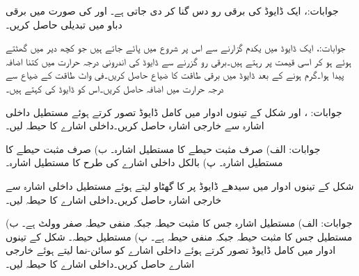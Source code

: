 جوابات:، 
ایک ڈایوڈ کی برقی رو دس گنا کر دی جاتی ہے۔ اور  کی صورت میں برقی دباو میں تبدیلی حاصل کریں۔

جوابات:، 
ایک ڈایوڈ میں یکدم  گزارنے سے اس پر شروع میں  پائے جاتے ہیں جو کچھ دیر میں گھٹتے ہوئے  ہو کر اسی قیمت پر رہتے ہیں۔برقی رو گزرنے سے ڈایوڈ کی اندرونی درجہ حرارت میں کتنا اضافہ پیدا ہوا۔گرم ہونے کے بعد ڈایوڈ میں برقی طاقت کا ضیاع حاصل کریں۔فی واٹ طاقت کے ضیاع سے درجہ حرارت میں اضافہ حاصل کریں۔اس کو ڈایوڈ کی 
 کہتے ہیں۔

جوابات: ،  اور 
شکل  کے تینوں ادوار میں کامل ڈایوڈ تصور کرتے ہوئے مستطیل داخلی اشارہ  سے  خارجی اشارہ  حاصل کریں۔داخلی اشارے کا حیطہ  لیں۔ 


جوابات: الف) صرف مثبت  حیطے کا مستطیل اشارہ۔ ب) صرف مثبت  حیطے کا مستطیل اشارہ۔ پ) بالکل داخلی اشارے کی طرح  کا مستطیل اشارہ۔

شکل  کے تینوں ادوار میں سیدھے ڈایوڈ پر  کا گھٹاو لیتے ہوئے  مستطیل داخلی اشارہ  سے  خارجی اشارہ  حاصل کریں۔داخلی اشارے کا حیطہ  لیں۔ 

جوابات: الف) مستطیل اشارہ جس کا مثبت حیطہ   جبکہ منفی حیطہ صفر وولٹ ہے۔ ب) مستطیل جس کا مثبت حیطہ  جبکہ منفی حیطہ  ہے۔ پ) مستطیل  حیطہ۔
شکل  کے تینوں ادوار میں کامل ڈایوڈ تصور کرتے ہوئے داخلی اشارے  کو سائن-نما لیتے ہوئے خارجی اشارے  حاصل کریں۔داخلی اشارے کا حیطہ  لیں۔ 

